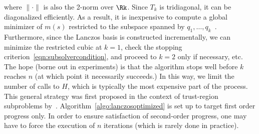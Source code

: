 where $\|\cdot\|$ is also the 2-norm over $\Rk$.
Since $T_k$ is tridiagonal, it can be diagonalized efficiently. As a result, it is inexpensive to compute a global minimizer of $m(s)$ restricted to the subspace spanned by $q_1, \ldots, q_k$~\citep[\S6.1]{cartis2011adaptivecubicPartI}.
%
Furthermore, since the Lanczos basis is constructed incrementally, we can minimize the restricted cubic at $k = 1$, check the stopping criterion~\eqref{eqn:subsolvercondition}, and proceed to $k = 2$ only if necessary, etc. The hope (borne out in experiments) is that the algorithm stops well before $k$ reaches $n$ (at which point it necessarily succeeds.) In this way, we limit the number of calls to $H$, which is typically the most expensive part of the process. This general strategy was first proposed in the context of trust-region subproblems by~\citet{gould1999solving}. Algorithm~\ref{algo:lanczosoptimized} is set up to target first order progress only. In order to ensure satisfaction of second-order progress, one may have to force the execution of $n$ iterations (which is rarely done in practice).





